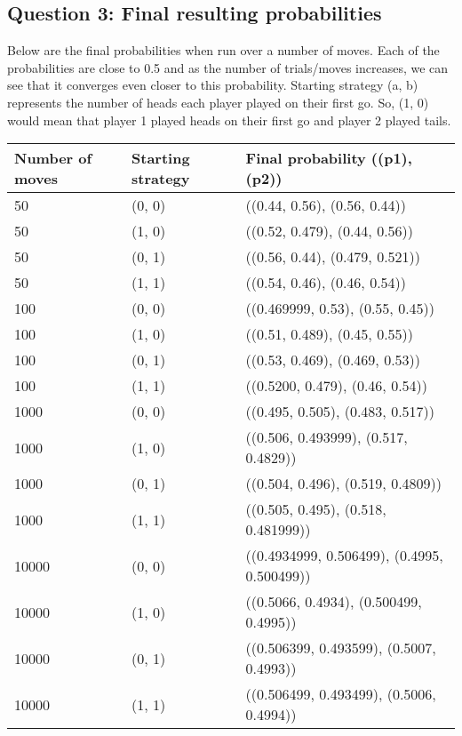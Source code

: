 \documentclass[11pt]{article}
\begin{document}
\subsection{Question 3: Final resulting probabilities}
Below are the final probabilities when run over a number of moves. Each of the probabilities are close to 0.5 and 
as the number of trials/moves increases, we can see that it converges even closer to this probability. Starting strategy (a, b) represents the number of heads each player played on their first go. So, (1, 0) would mean that player 1 played heads on their first go and player 2 played tails.
\begin{table}
	\begin{tabular}{|p{3cm}| p{3cm} | p{6cm}|}
	\hline
	Number of moves & Starting strategy & Final probability ((p1), (p2)) \\
	\hline
	50 & (0, 0) & ((0.44, 0.56), (0.56, 0.44)) \\
	\hline
	50 & (1, 0) & ((0.52, 0.479), (0.44, 0.56)) \\
	\hline
	50 & (0, 1) & ((0.56, 0.44), (0.479, 0.521)) \\
	\hline
	50 & (1, 1) & ((0.54, 0.46), (0.46, 0.54)) \\
	\hline
	100 & (0, 0) & ((0.469999, 0.53), (0.55, 0.45)) \\
	\hline
	100 & (1, 0) & ((0.51, 0.489), (0.45, 0.55)) \\
	\hline
	100 & (0, 1) & ((0.53, 0.469), (0.469, 0.53)) \\
	\hline
	100 & (1, 1) & ((0.5200, 0.479), (0.46, 0.54)) \\
	\hline
	1000 & (0, 0) & ((0.495, 0.505), (0.483, 0.517)) \\
	\hline
	1000 & (1, 0) & ((0.506, 0.493999), (0.517, 0.4829)) \\
	\hline
	1000 & (0, 1) & ((0.504, 0.496), (0.519, 0.4809)) \\
	\hline
	1000 & (1, 1) & ((0.505, 0.495), (0.518, 0.481999)) \\
	\hline
	10000 & (0, 0) & ((0.4934999, 0.506499), (0.4995, 0.500499)) \\
	\hline
	10000 & (1, 0) & ((0.5066, 0.4934), (0.500499, 0.4995)) \\
	\hline
	10000 & (0, 1) & ((0.506399, 0.493599), (0.5007, 0.4993)) \\
	\hline
	10000 & (1, 1) & ((0.506499, 0.493499), (0.5006, 0.4994)) \\
	\hline
	\end{tabular}
\end{table}
\end{document}
